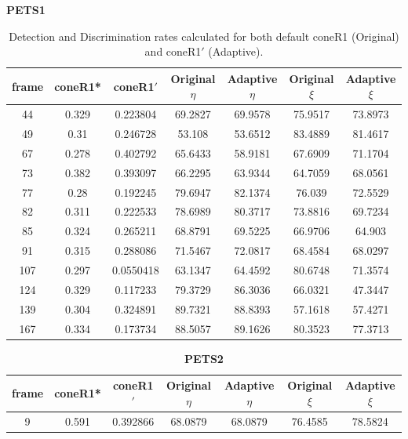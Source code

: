 \begin{appendices}
\begin{table}
\centering
\caption{\textbf{PETS1}}
\begin{tabular}{ |c|c|c|c|c|c|c| }
\hline
\textbf{frame} &  \textbf{coneR1*} &  \textbf{coneR1$'$} &  \textbf{Original $\eta$} &  \textbf{Adaptive $\eta$} &  \textbf{Original $\xi$} &  \textbf{Adaptive $\xi$} \\
\hline
\hline
44 &  0.329 &  0.223804 &  69.2827 &  69.9578 &  75.9517 &  73.8973 \\
\hline
49 &  0.31 &  0.246728 &  53.108 &  53.6512 &  83.4889 &  81.4617 \\
\hline
67 &  0.278 &  0.402792 &  65.6433 &  58.9181 &  67.6909 &  71.1704 \\
\hline
73 &  0.382 &  0.393097 &  66.2295 &  63.9344 &  64.7059 &  68.0561 \\
\hline
77 &  0.28 &  0.192245 &  79.6947 &  82.1374 &  76.039 &  72.5529 \\
\hline
82 &  0.311 &  0.222533 &  78.6989 &  80.3717 &  73.8816 &  69.7234 \\
\hline
85 &  0.324 &  0.265211 &  68.8791 &  69.5225 &  66.9706 &  64.903 \\
\hline
91 &  0.315 &  0.288086 &  71.5467 &  72.0817 &  68.4584 &  68.0297 \\
\hline
107 &  0.297 &  0.0550418 &  63.1347 &  64.4592 &  80.6748 &  71.3574 \\
\hline
124 &  0.329 &  0.117233 &  79.3729 &  86.3036 &  66.0321 &  47.3447 \\
\hline
139 &  0.304 &  0.324891 &  89.7321 &  88.8393 &  57.1618 &  57.4271 \\
\hline
167 &  0.334 &  0.173734 &  88.5057 &  89.1626 &  80.3523 &  77.3713 \\
\hline
\end{tabular}
\caption*{Detection and Discrimination rates calculated for both default coneR1 (Original) and coneR1$'$ (Adaptive).}
\end{table}
\begin{table}
\centering
\caption{\textbf{PETS2}}
\begin{tabular}{ |c|c|c|c|c|c|c| }
\hline
\textbf{frame} &  \textbf{coneR1*} &  \textbf{coneR1$'$} &  \textbf{Original $\eta$} &  \textbf{Adaptive $\eta$} &  \textbf{Original $\xi$} &  \textbf{Adaptive $\xi$} \\
\hline
\hline
9 &  0.591 &  0.392866 &  68.0879 &  68.0879 &  76.4585 &  78.5824 \\

\end{tabular}
\end{table}
\end{appendices}
